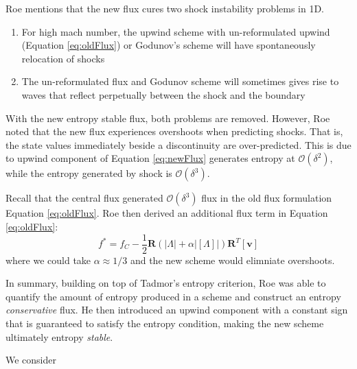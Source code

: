 \documentclass[a4paper]{article}
\numberwithin{equation}{section}
\begin{document}
Roe mentions that the new flux cures two shock instability problems in 1D.
\begin{enumerate}
    \item For high mach number, the upwind scheme with un-reformulated upwind (Equation \ref{eq:oldFlux}) or Godunov's scheme will have spontaneously relocation of shocks
    \item The un-reformulated flux and Godunov scheme will sometimes gives rise to waves that reflect perpetually between the shock and the boundary
\end{enumerate}
With the new entropy stable flux, both problems are removed. However, Roe noted that the new flux experiences overshoots when predicting shocks. That is, the state values immediately beside a discontinuity are over-predicted. This is due to upwind component of Equation \ref{eq:newFlux} generates entropy at $\mathcal{O}(\delta^2)$, while the entropy generated by shock is $\mathcal{O}(\delta^3)$. 

Recall that the central flux generated $\mathcal{O}(\delta^3)$ flux in the old flux formulation Equation \ref{eq:oldFlux}. Roe then derived an additional flux term in Equation \ref{eq:oldFlux}:
\begin{equation}
    f^* = f_C - \frac{1}{2}\mathbf{R}(\left|\Lambda \right| + \alpha \left| \left[\Lambda\right] \right|) \mathbf{R}^T \left[\mathbf{v}\right]
\end{equation}
where we could take $\alpha \approx 1/3$ and the new scheme would elimniate overshoots.

In summary, building on top of Tadmor's entropy criterion, Roe was able to quantify the amount of entropy produced in a scheme and construct an entropy \textit{conservative} flux. He then introduced an upwind component with a constant sign that is guaranteed to satisfy the entropy condition, making the new scheme ultimately entropy \textit{stable}.

We consider \cite[text]{}
\end{document}
